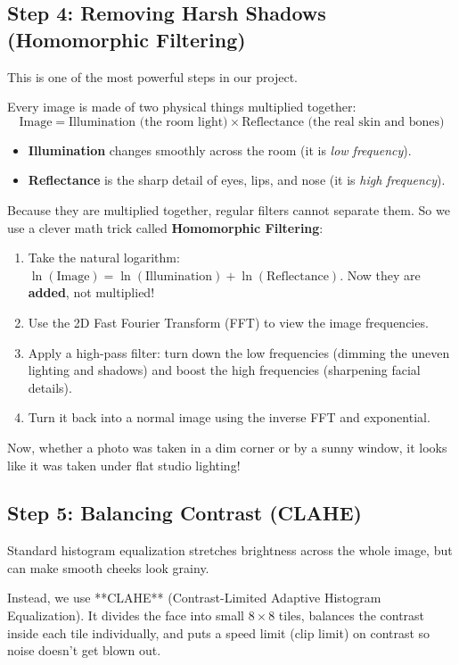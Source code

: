 \documentclass[11pt,a4paper]{article}
\begin{document}
\subsection{Step 4: Removing Harsh Shadows (Homomorphic Filtering)}
This is one of the most powerful steps in our project.

Every image is made of two physical things multiplied together:
\begin{equation}
    \text{Image} = \text{Illumination (the room light)} \times \text{Reflectance (the real skin and bones)}
\end{equation}
\begin{itemize}[leftmargin=1.5em]
    \item \textbf{Illumination} changes smoothly across the room (it is \emph{low frequency}).
    \item \textbf{Reflectance} is the sharp detail of eyes, lips, and nose (it is \emph{high frequency}).
\end{itemize}

Because they are multiplied together, regular filters cannot separate them. So we use a clever math trick called \textbf{Homomorphic Filtering}:
\begin{enumerate}[leftmargin=1.5em]
    \item Take the natural logarithm: $\ln(\text{Image}) = \ln(\text{Illumination}) + \ln(\text{Reflectance})$. Now they are \textbf{added}, not multiplied!
    \item Use the 2D Fast Fourier Transform (FFT) to view the image frequencies.
    \item Apply a high-pass filter: turn down the low frequencies (dimming the uneven lighting and shadows) and boost the high frequencies (sharpening facial details).
    \item Turn it back into a normal image using the inverse FFT and exponential.
\end{enumerate}
Now, whether a photo was taken in a dim corner or by a sunny window, it looks like it was taken under flat studio lighting!

\subsection{Step 5: Balancing Contrast (CLAHE)}
Standard histogram equalization stretches brightness across the whole image, but can make smooth cheeks look grainy. 

Instead, we use **CLAHE** (Contrast-Limited Adaptive Histogram Equalization). It divides the face into small $8 \times 8$ tiles, balances the contrast inside each tile individually, and puts a speed limit (clip limit) on contrast so noise doesn't get blown out.
\end{document}
